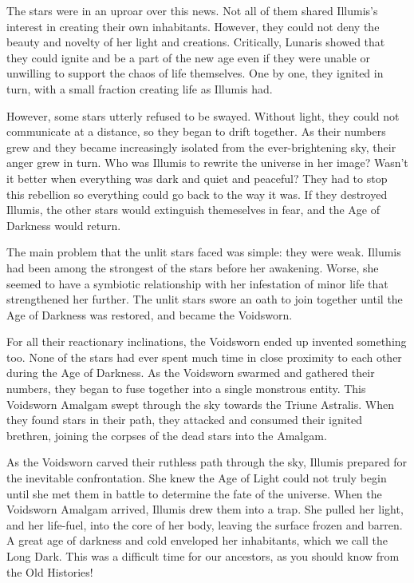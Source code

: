     The stars were in an uproar over this news.
    Not all of them shared Illumis's interest in creating their own inhabitants.
    However, they could not deny the beauty and novelty of her light and creations.
    Critically, Lunaris showed that they could ignite and be a part of the new age even if they were unable or unwilling to support the chaos of life themselves.
    One by one, they ignited in turn, with a small fraction creating life as Illumis had.

    However, some stars utterly refused to be swayed.
    Without light, they could not communicate at a distance, so they began to drift together.
    As their numbers grew and they became increasingly isolated from the ever-brightening sky, their anger grew in turn.
    Who was Illumis to rewrite the universe in her image?
    Wasn't it better when everything was dark and quiet and peaceful?
    They had to stop this rebellion so everything could go back to the way it was.
    If they destroyed Illumis, the other stars would extinguish themeselves in fear, and the Age of Darkness would return.

    The main problem that the unlit stars faced was simple: they were weak.
    Illumis had been among the strongest of the stars before her awakening.
    Worse, she seemed to have a symbiotic relationship with her infestation of minor life that strengthened her further.
    The unlit stars swore an oath to join together until the Age of Darkness was restored, and became the Voidsworn.

    For all their reactionary inclinations, the Voidsworn ended up invented something too.
    None of the stars had ever spent much time in close proximity to each other during the Age of Darkness.
    As the Voidsworn swarmed and gathered their numbers, they began to fuse together into a single monstrous entity.
    This Voidsworn Amalgam swept through the sky towards the Triune Astralis.
    When they found stars in their path, they attacked and consumed their ignited brethren, joining the corpses of the dead stars into the Amalgam.

    As the Voidsworn carved their ruthless path through the sky, Illumis prepared for the inevitable confrontation.
    She knew the Age of Light could not truly begin until she met them in battle to determine the fate of the universe.
    When the Voidsworn Amalgam arrived, Illumis drew them into a trap.
    She pulled her light, and her life-fuel, into the core of her body, leaving the surface frozen and barren.
    A great age of darkness and cold enveloped her inhabitants, which we call the Long Dark.
    This was a difficult time for our ancestors, as you should know from the Old Histories!

